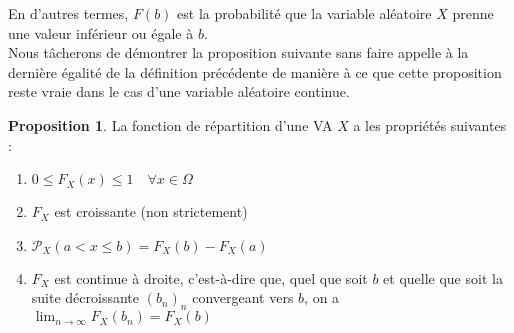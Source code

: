 \documentclass[a4paper,12pt]{report}
\theoremstyle{definition}
\newcommand{\ra}{\rightarrow}
\renewcommand{\(}{\left(}
\renewcommand{\)}{\right)}
\renewcommand{\P}{\mathcal{P}}
\newtheorem{prop}[thm]{Proposition}
\begin{document}
            En d'autres termes, $F(b)$ est la probabilité que la variable aléatoire $X$ prenne une valeur inférieur ou égale à $b$.\\
            Nous tâcherons de démontrer la proposition suivante sans faire appelle à la dernière égalité de la définition précédente de manière à ce que cette proposition reste vraie dans le cas d'une variable aléatoire continue.
            
            \begin{leftbar}
            \begin{prop}
                La fonction de répartition d'une VA $X$ a les propriétés suivantes :
                \begin{enumerate}[label=(\roman*)]
                    \item $0\leq F_X(x)\leq 1\quad \forall x\in \Omega$ 
                    \item $F_X$ est croissante (non strictement) 
                    \item $\displaystyle{\P_X(a < x \leq b) = F_X(b)-F_X(a)}$
                    \item $F_X$ est continue à droite, c'est-à-dire que, quel que soit $b$ et quelle que soit la suite décroissante $(b_n)_n$ convergeant vers $b$, on a $\displaystyle{\lim_{n \ra \infty} F_X(b_n) = F_X(b)}$
                    \label{propprop}
                \end{enumerate}
            \end{prop}
            \end{leftbar}
            
\end{document}
